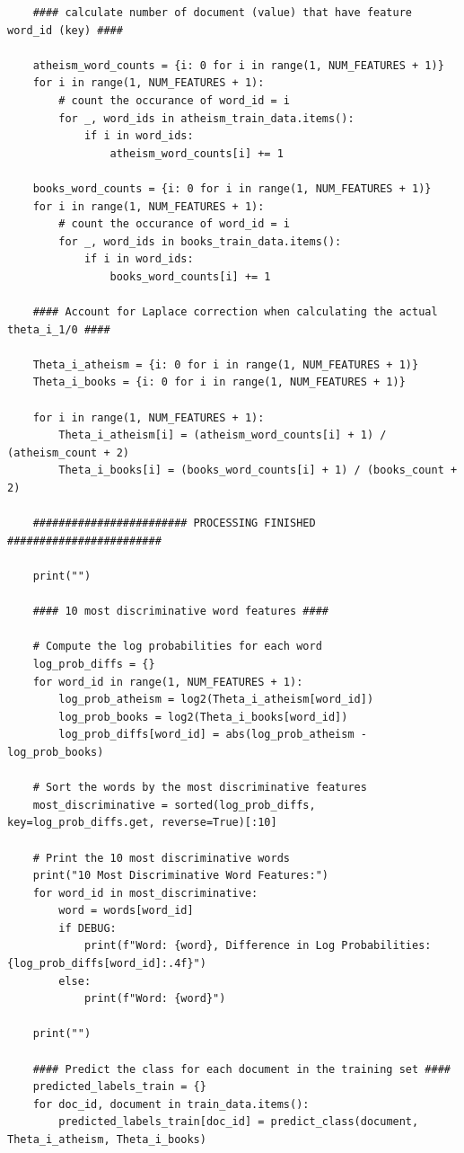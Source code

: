 \documentclass[12pt]{article}
\begin{document}
\begin{enumerate}
\begin{lstlisting}
    #### calculate number of document (value) that have feature word_id (key) ####
    
    atheism_word_counts = {i: 0 for i in range(1, NUM_FEATURES + 1)} 
    for i in range(1, NUM_FEATURES + 1):
        # count the occurance of word_id = i
        for _, word_ids in atheism_train_data.items():
            if i in word_ids:
                atheism_word_counts[i] += 1

    books_word_counts = {i: 0 for i in range(1, NUM_FEATURES + 1)} 
    for i in range(1, NUM_FEATURES + 1):
        # count the occurance of word_id = i
        for _, word_ids in books_train_data.items():
            if i in word_ids:
                books_word_counts[i] += 1
                
    #### Account for Laplace correction when calculating the actual theta_i_1/0 ####
    
    Theta_i_atheism = {i: 0 for i in range(1, NUM_FEATURES + 1)}
    Theta_i_books = {i: 0 for i in range(1, NUM_FEATURES + 1)}
    
    for i in range(1, NUM_FEATURES + 1):
        Theta_i_atheism[i] = (atheism_word_counts[i] + 1) / (atheism_count + 2)
        Theta_i_books[i] = (books_word_counts[i] + 1) / (books_count + 2)
        
    ######################## PROCESSING FINISHED ########################
    
    print("")
        
    #### 10 most discriminative word features ####
    
    # Compute the log probabilities for each word
    log_prob_diffs = {}
    for word_id in range(1, NUM_FEATURES + 1):
        log_prob_atheism = log2(Theta_i_atheism[word_id])
        log_prob_books = log2(Theta_i_books[word_id])
        log_prob_diffs[word_id] = abs(log_prob_atheism - log_prob_books)

    # Sort the words by the most discriminative features
    most_discriminative = sorted(log_prob_diffs, key=log_prob_diffs.get, reverse=True)[:10]

    # Print the 10 most discriminative words
    print("10 Most Discriminative Word Features:")
    for word_id in most_discriminative:
        word = words[word_id]
        if DEBUG:
            print(f"Word: {word}, Difference in Log Probabilities: {log_prob_diffs[word_id]:.4f}")
        else:
            print(f"Word: {word}")
        
    print("")
    
    #### Predict the class for each document in the training set ####
    predicted_labels_train = {}
    for doc_id, document in train_data.items():
        predicted_labels_train[doc_id] = predict_class(document, Theta_i_atheism, Theta_i_books)


\end{lstlisting}
\end{enumerate}
\end{document}

